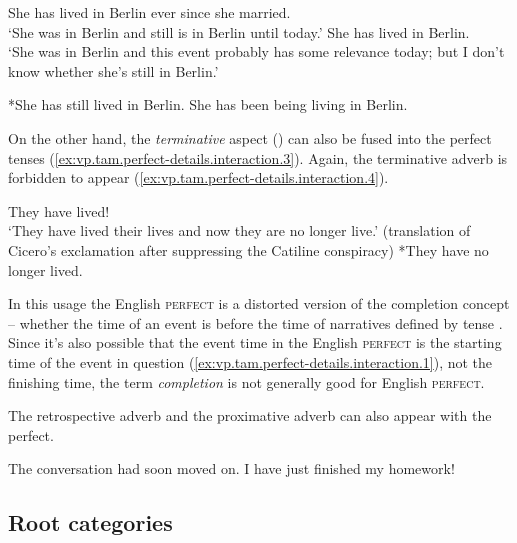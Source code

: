 \documentclass[UTF8, a4paper, oneside, scheme=plain, 12pt]{ctexbook}
\newcommand*{\citesec}[1]{\S~{#1}}
\newcommand*{\term}[1]{\emph{#1}}
\newcommand{\category}[1]{\textsc{#1}}
\newcommand{\translate}[1]{`#1'}
\begin{document}
\begin{exe}
    \ex\label{ex:vp.tam.perfect-details.interaction.1} \begin{xlist}
        \ex She has lived in Berlin ever since she married. \\ 
        \translate{She was in Berlin and still is in Berlin until today.}
        \ex She has lived in Berlin. \\
        \translate{She was in Berlin and this event probably has some relevance today; 
        but I don't know whether she's still in Berlin.}
    \end{xlist}
    \ex\label{ex:vp.tam.perfect-details.interaction.2} 
    *She has still lived in Berlin.
    \ex\label{ex:vp.tam.perfect-details.interaction.5} 
    She has been being living in Berlin.
\end{exe}

On the other hand, the \emph{terminative} aspect 
()
can also be fused into the perfect tenses
(\ref{ex:vp.tam.perfect-details.interaction.3}).
Again, the terminative adverb is forbidden to appear
(\ref{ex:vp.tam.perfect-details.interaction.4}).

\begin{exe}
    \ex\label{ex:vp.tam.perfect-details.interaction.3} They have lived! \\
    \translate{They have lived their lives and now they are no longer live.} 
    (translation of Cicero's exclamation after suppressing the Catiline conspiracy)
    \ex\label{ex:vp.tam.perfect-details.interaction.4} *They have no longer lived.
\end{exe}
In this usage the English \category{perfect}
is a distorted version of the completion concept 
-- whether the time of an event is before the time of narratives defined by tense 
\citep[\citesec{19.7}]{dixon2012basic3}.
Since it's also possible that the event time in the English \category{perfect} 
is the starting time of the event in question
(\ref{ex:vp.tam.perfect-details.interaction.1}),
not the finishing time,
the term \term{completion} is not generally good for English \category{perfect}.

The retrospective adverb and the proximative adverb can also appear with the perfect.

\begin{exe}
    \ex The conversation had soon moved on. 
    \ex I have just finished my homework!
\end{exe}

\subsection{Root categories}
\end{document}
